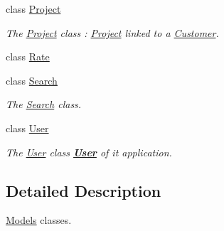 \begin{DoxyCompactItemize}
class \hyperlink{classModels_1_1Project}{Project}
\begin{DoxyCompactList}\small\item\em The \hyperlink{classModels_1_1Project}{Project} class \-: \hyperlink{classModels_1_1Project}{Project} linked to a \hyperlink{classModels_1_1Customer}{Customer}. \end{DoxyCompactList}\item 
class \hyperlink{classModels_1_1Rate}{Rate}
\item 
class \hyperlink{classModels_1_1Search}{Search}
\begin{DoxyCompactList}\small\item\em The \hyperlink{classModels_1_1Search}{Search} class. \end{DoxyCompactList}\item 
class \hyperlink{classModels_1_1User}{User}
\begin{DoxyCompactList}\small\item\em The \hyperlink{classModels_1_1User}{User} class {\bfseries \hyperlink{classModels_1_1User}{User}} of it application. \end{DoxyCompactList}\end{DoxyCompactItemize}


\subsection{Detailed Description}
\hyperlink{namespaceModels}{Models} classes. 